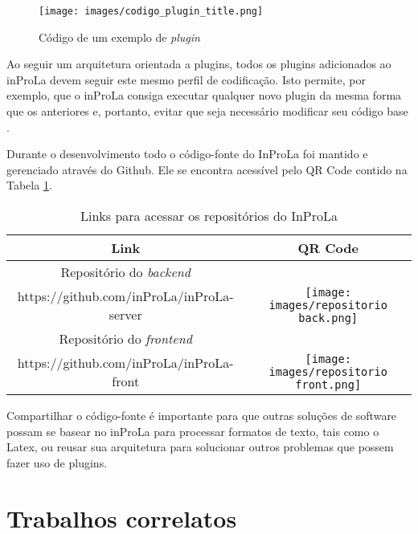 \documentclass[12pt]{article}
\begin{document}
\begin{figure}[ht!]
\centering
\texttt{[image: images/codigo\_plugin\_title.png]}
\caption{Código de um exemplo de \textit{plugin}}
\label{fig:codigo_exemplo_plugin}
\end{figure}

Ao seguir um arquitetura orientada a plugins, todos os plugins adicionados ao inProLa devem seguir este mesmo perfil de codificação. Isto permite, por exemplo, que o inProLa consiga executar qualquer novo plugin da mesma forma que os anteriores e, portanto, evitar que seja necessário modificar seu código base \cite{cervantes2006using}. 

Durante o desenvolvimento todo o código-fonte do InProLa foi mantido e gerenciado através do Github. Ele se encontra acessível pelo QR Code contido na Tabela \ref{tab:repositorios}.

\begin{table}[ht!]
\centering
\caption{Links para acessar os repositórios do InProLa}
\label{tab:repositorios}
\begin{tabular}{ |c|c| } 
 \hline
 \textbf{Link} & \textbf{QR Code} \\ 
 \hline
 Repositório do \textit{backend} \\https://github.com/inProLa/inProLa-server & 
 \begin{minipage}{.3\textwidth}
    \centering
    \texttt{[image: images/repositorio back.png]}
 \end{minipage}
 \\ 
 \hline
  Repositório do \textit{frontend} \\https://github.com/inProLa/inProLa-front & 
 \begin{minipage}{.3\textwidth}
    \centering
    \texttt{[image: images/repositorio front.png]}
 \end{minipage}
 \\ 
 \hline
\end{tabular}
\end{table}

Compartilhar o código-fonte é importante para que outras soluções de software possam se basear no inProLa para processar formatos de texto, tais como o Latex, ou reusar sua arquitetura para solucionar outros problemas que possem fazer uso de plugins.

\section{Trabalhos correlatos}
\end{document}
